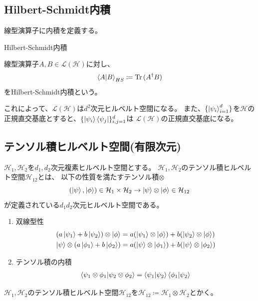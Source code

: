 \subsection{Hilbert-Schmidt内積}

線型演算子に内積を定義する。

\begin{Def} \label{Hilbert-Schmidt内積}Hilbert-Schmidt内積

  線型演算子$A,B\in\mathcal{L}(\mathcal{H})$に対し、
  $$
  \braket{A|B}_{HS} \coloneqq \text{Tr}\,(A^\dagger B)
  $$
  をHilbert-Schmidt内積という。
\end{Def}
これによって、$\mathcal{L}(\mathcal{H})$は$d^2$次元ヒルベルト空間になる。
また、$\{\ket{\psi_i}_{i=1}^d\}$を$\mathcal{H}$の正規直交基底とすると、$\{\ket{\psi_i}\bra{\psi_j}\}_{i,j=1}^d$は
$\mathcal{L}(\mathcal{H})$の正規直交基底になる。

\subsection{テンソル積ヒルベルト空間(有限次元)}
$\mathcal{H}_1,\mathcal{H}_2$を$d_1,d_2$次元複素ヒルベルト空間とする。
$\mathcal{H}_1,\mathcal{H}_2$のテンソル積ヒルベルト空間$\mathcal{H}_{12}$とは、
以下の性質を満たすテンソル積$\otimes$
$$
  (\ket{\psi},\ket{\phi}) \in \mathcal{H}_1 \times \mathcal{H}_2 \to \ket{\psi} \otimes \ket{\phi} \in \mathcal{H}_{12}
$$
が定義されている$d_1 d_2$次元ヒルベルト空間である。
\begin{Prop}
  \begin{enumerate}
    \item 双線型性
    \begin{align}
      (a\ket{\psi_1} + b\ket{\psi_2})\otimes \ket{\phi} &= a(\ket{\psi_1}\otimes\ket{\phi}) + b(\ket{\psi_2}\otimes\ket{\phi}) \nonumber\\
      \ket{\psi} \otimes (a\ket{\phi_1} + b\ket{\phi_2}) &= a(\ket{\psi}\otimes\ket{\phi_1}) + b(\ket{\psi}\otimes\ket{\phi_2}) \nonumber
    \end{align}

    \item テンソル積の内積
    \begin{align}
      \braket{\psi_1\otimes\phi_1 | \psi_2\otimes\phi_2} = \braket{\psi_1 | \psi_2}\braket{\phi_1 | \psi_2}
    \end{align}
  \end{enumerate}
\end{Prop}

$\mathcal{H}_1,\mathcal{H}_2$のテンソル積ヒルベルト空間$\mathcal{H}_{12}$を$\mathcal{H}_{12}\coloneqq\mathcal{H}_1\otimes\mathcal{H}_2$とかく。


